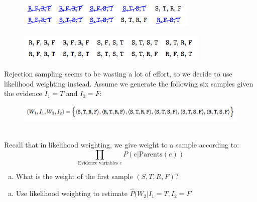 \documentclass[11pt]{article}
\newif\ifsol
\begin{document}
\begin{enumerate}
\begin{enumerate}[a)]
\begin{figure}[h]
                \centering
                \vspace{-1em}
                \includegraphics[width=.55\textwidth]{figs/crossed-off}
                \vspace{-1.5em}
            \end{figure}
        \else
            \begin{figure}[h]
                \centering
                \vspace{-1em}
                \includegraphics[width=.55\textwidth]{figs/samples}
                \vspace{-1.5em}
            \end{figure}
        \fi
    \end{enumerate}
    Rejection sampling seems to be wasting a lot of effort, so we decide to use likelihood weighting instead. Assume we generate the following six samples given the evidence $I_1 = T$ and $I_2 = F$:
    \begin{figure}[h!]
        \centering
        \includegraphics[width=.7\textwidth]{figs/samplelist}
    \end{figure}\\
    Recall that in likelihood weighting, we give weight to a sample according to:
    \[
    \prod_{\text{Evidence variables } e} P(e|\text{Parents}(e))
    \]
    \begin{enumerate}[c)]
        \item What is the weight of the first sample $(S,T,R,F)$?\\
        \ifsol
            \textcolor{blue}{The evidence is $I_1 = T, I_2 = F$. The weight of the first sample is therefore:
            $$w = P(I_1=T|W_1=S) \cdot P(I_2=F|W_2=R) = 0.9 \cdot 0.8 = 0.72$$}
            \vspace{-1em}
        \else
            \vspace{2em}
        \fi
    \end{enumerate}
    \begin{enumerate}[d)]
        \item Use likelihood weighting to estimate $\hat{P}(W_2|I_1=T,I_2=F$\\

\end{enumerate}
\end{enumerate}
\end{document}
